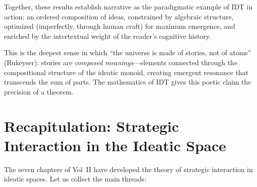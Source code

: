 \begin{interpretation}
Together, these results establish narrative as the paradigmatic example of
IDT in action: an ordered composition of ideas, constrained by algebraic
structure, optimized (imperfectly, through human craft) for maximum
emergence, and enriched by the intertextual weight of the reader's
cognitive history.

This is the deepest sense in which ``the universe is made of stories, not
of atoms'' (Rukeyser): stories are \emph{composed meanings}---elements
connected through the compositional structure of the ideatic monoid, creating
emergent resonance that transcends the sum of parts.  The mathematics of
IDT gives this poetic claim the precision of a theorem.
\end{interpretation}


\section{Recapitulation: Strategic Interaction in the Ideatic Space}

The seven chapters of Vol~II have developed the theory of strategic
interaction in ideatic spaces.  Let us collect the main threads:

